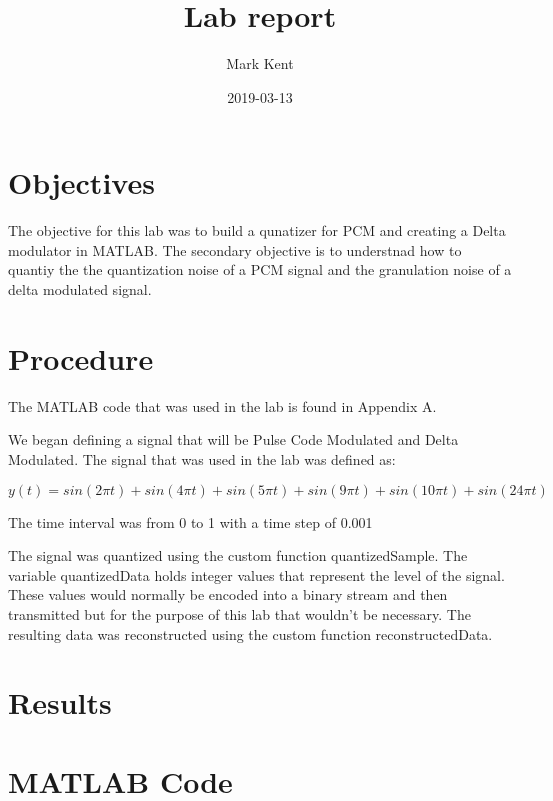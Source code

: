 \documentclass{article}
\title{Lab report}
\date{2019-03-13}
\author{Mark Kent}
\begin{document}
\section{Objectives}

\indent
The objective for this lab was to build a qunatizer for PCM and creating a Delta
modulator in MATLAB. The secondary objective is to understnad how to quantiy the
the quantization noise of a PCM signal and the granulation noise of a delta
modulated signal.


\section{Procedure}

The MATLAB code that was used in the lab is found in Appendix A.

We began defining a signal that will be Pulse Code Modulated and Delta Modulated.
The signal that was used in the lab was defined as:

\begin{center}
$
y(t) = sin(2 \pi t) + sin(4 \pi t) +sin(5 \pi t) +sin(9 \pi t) +sin(10 \pi t) +sin(24 \pi t)
$
\end{center}

\noindent
The time interval was from 0 to 1 with a time step of 0.001\\
\noindent

The signal was quantized using the custom function quantizedSample.
The variable quantizedData holds integer values that represent the level of the signal.
These values would normally be encoded into a binary stream and then transmitted but
for the purpose of this lab that wouldn't be necessary.
\noindent
The resulting data was reconstructed using the custom function reconstructedData.





\section{Results}


\appendix
\section{MATLAB Code}
\end{document}
